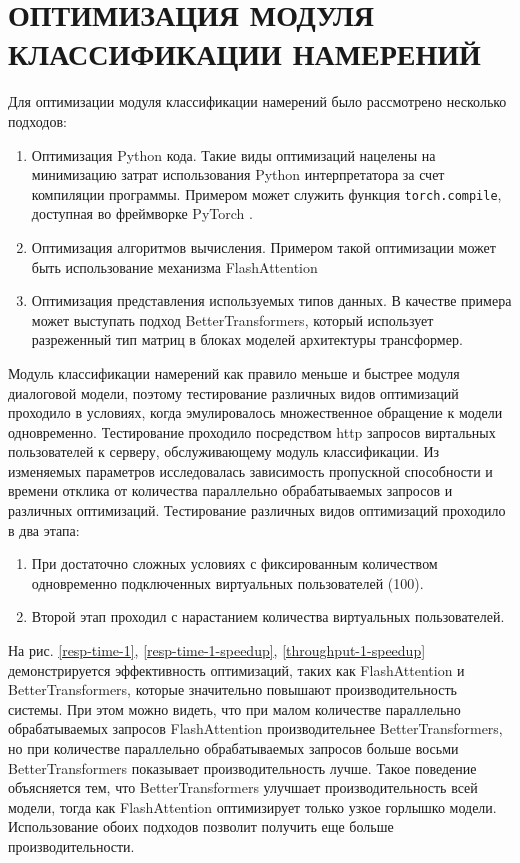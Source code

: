 \section{ОПТИМИЗАЦИЯ МОДУЛЯ КЛАССИФИКАЦИИ НАМЕРЕНИЙ}
Для оптимизации модуля классификации намерений было рассмотрено несколько подходов:
\begin{enumerate}
    \item Оптимизация Python кода. Такие виды оптимизаций нацелены на минимизацию затрат использования Python интерпретатора за счет компиляции программы. Примером может служить функция \texttt{torch.compile}, доступная во фреймворке PyTorch \cite{pt-docs}.
    \item Оптимизация алгоритмов вычисления. Примером такой оптимизации может быть использование механизма FlashAttention
    \item Оптимизация представления используемых типов данных. В качестве примера может выступать подход BetterTransformers, который использует разреженный тип матриц в блоках моделей архитектуры трансформер.
\end{enumerate}

Модуль классификации намерений как правило меньше и быстрее модуля диалоговой модели, поэтому тестирование различных видов оптимизаций проходило в условиях, когда эмулировалось множественное обращение к модели одновременно. Тестирование проходило посредством http запросов виртальных пользователей к серверу, обслуживающему модуль классификации. Из изменяемых параметров исследовалась зависимость пропускной способности и времени отклика от количества параллельно обрабатываемых запросов и различных оптимизаций. Тестирование различных видов оптимизаций проходило в два этапа:
\begin{enumerate}
    \item При достаточно сложных условиях с фиксированным количеством одновременно подключенных виртуальных пользователей (100).
    \item Второй этап проходил с нарастанием количества виртуальных пользователей.
\end{enumerate}

На рис. \ref{resp-time-1}, \ref{resp-time-1-speedup}, \ref{throughput-1-speedup} демонстрируется эффективность оптимизаций, таких как FlashAttention и BetterTransformers, которые значительно повышают производительность системы. При этом можно видеть, что при малом количестве параллельно обрабатываемых запросов FlashAttention производительнее BetterTransformers, но при количестве параллельно обрабатываемых запросов больше восьми BetterTransformers показывает производительность лучше. Такое поведение объясняется тем, что BetterTransformers улучшает производительность всей модели, тогда как FlashAttention оптимизирует только узкое горлышко модели. Использование обоих подходов позволит получить еще больше производительности.

